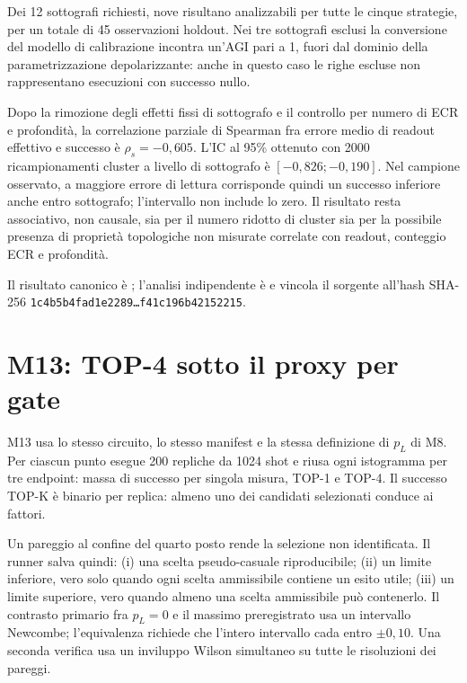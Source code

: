 \begin{onehalfspace}
Dei 12 sottografi richiesti, nove risultano analizzabili per tutte le cinque
strategie, per un totale di 45 osservazioni holdout. Nei tre sottografi esclusi
la conversione del modello di calibrazione incontra un'AGI pari a 1, fuori dal
dominio della parametrizzazione depolarizzante: anche in questo caso le righe
escluse non rappresentano esecuzioni con successo nullo.

Dopo la rimozione degli effetti fissi di sottografo e il controllo per numero di
ECR e profondit\`a, la correlazione parziale di Spearman fra errore medio di
readout effettivo e successo \`e $\rho_s=-0,605$. L'IC al 95\% ottenuto con 2000
ricampionamenti cluster a livello di sottografo \`e $[-0,826;-0,190]$. Nel
campione osservato, a maggiore errore di lettura corrisponde quindi un successo
inferiore anche entro sottografo; l'intervallo non include lo zero. Il risultato
resta associativo, non causale, sia per il numero ridotto di cluster sia per la
possibile presenza di propriet\`a topologiche non misurate correlate con readout,
conteggio ECR e profondit\`a.

Il risultato canonico \`e
; l'analisi indipendente
\`e  e vincola il sorgente
all'hash SHA-256 \texttt{1c4b5b4fad1e2289\ldots f41c196b42152215}.

\section{M13: TOP-4 sotto il proxy per gate}
\label{sec:app_comp_topk}

M13 usa lo stesso circuito, lo stesso manifest e la stessa definizione di $p_L$ di M8. Per ciascun punto esegue 200 repliche da 1024 shot e riusa ogni istogramma per tre endpoint: massa di successo per singola misura, TOP-1 e TOP-4. Il successo TOP-K \`e binario per replica: almeno uno dei candidati selezionati conduce ai fattori.

Un pareggio al confine del quarto posto rende la selezione non identificata. Il runner salva quindi: (i) una scelta pseudo-casuale riproducibile; (ii) un limite inferiore, vero solo quando ogni scelta ammissibile contiene un esito utile; (iii) un limite superiore, vero quando almeno una scelta ammissibile pu\`o contenerlo. Il contrasto primario fra $p_L=0$ e il massimo preregistrato usa un intervallo Newcombe; l'equivalenza richiede che l'intero intervallo cada entro $\pm0,10$. Una seconda verifica usa un inviluppo Wilson simultaneo su tutte le risoluzioni dei pareggi.


\end{onehalfspace}
